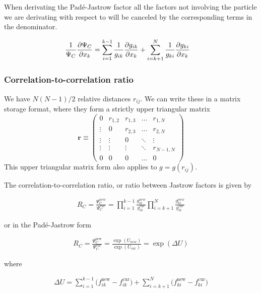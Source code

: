 \documentclass[11pt]{article}
\begin{document}
			When derivating the Padé-Jastrow factor all the factors not involving the particle we are derivating with respect to will be canceled by the corresponding terms in the denominator.

			\begin{align}
				\frac{1}{\Psi_C}\pdv{\Psi_C}{x_k} &= \sum_{i=1}^{k-1}\frac{1}{g_{ik}}\pdv{g_{ik}}{x_k} +  \sum_{i=k+1}^{N}\frac{1}{g_{ki}}\pdv{g_{ki}}{x_k}
			\end{align}

		\subsubsection{Correlation-to-correlation ratio}

			We have $N\left(N-1\right)/2$ relative distances $r_{ij}$. We can
			write these in a matrix storage format, where they form a strictly
			upper triangular matrix
			\[
			\mathbf{r}\equiv\left(\begin{array}{ccccc}
			0 & r_{1,2} & r_{1,3} & \dots & r_{1,N}\\
			\vdots & 0 & r_{2,3} & \dots & r_{2,N}\\
			\vdots & \vdots & 0 & \ddots & \vdots\\
			\vdots & \vdots & \vdots & \ddots & r_{N-1,N}\\
			0 & 0 & 0 & \dots & 0
			\end{array}\right)
			\]
			This upper triangular matrix form also applies to $g=g\left(r_{ij}\right)$.

			The correlation-to-correlation ratio, or ratio between Jastrow factors
			is given by

			\begin{align}
				R_{C}=\frac{\Psi_{C}^{new}}{\Psi_{C}^{cur}}=\prod_{i=1}^{k-1}\frac{g_{ik}^{new}}{g_{ik}^{cur}}\prod_{i=k+1}^{N}\frac{g_{ki}^{new}}{g_{ki}^{cur}}
			\end{align}

			or in the Padé-Jastrow form

			\begin{align}
				R_{C}=\frac{\Psi_{C}^{\mathrm{new}}}{\Psi_{C}^{\mathrm{cur}}}=\frac{\exp{\left(U_{new}\right)}}{\exp{\left(U_{cur}\right)}}=\exp{\left(\Delta U\right)}
			\end{align}

			where

			\begin{align}
				\Delta U =
				\sum_{i=1}^{k-1}\big(f_{ik}^\mathrm{new}-f_{ik}^\mathrm{cur}\big)
				+
				\sum_{i=k+1}^{N}\big(f_{ki}^\mathrm{new}-f_{ki}^\mathrm{cur}\big)
			\end{align}
\end{document}
